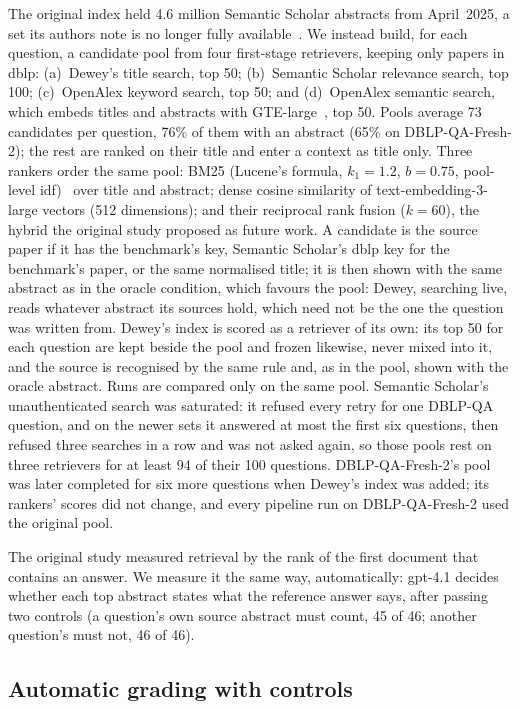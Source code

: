 \documentclass[conference]{IEEEtran}
\newcommand{\dq}{DBLP-QA}
\newcommand{\freshb}{DBLP-QA-Fresh-2}
\begin{document}
The original index held 4.6 million Semantic Scholar abstracts from April~2025, a set its authors note is
no longer fully available~\cite{neekhra2026ragscholar}. We instead build, for each question, a candidate
pool from four first-stage retrievers, keeping only papers in dblp: (a)~Dewey's title search, top 50;
(b)~Semantic Scholar relevance search, top 100; (c)~OpenAlex keyword search, top 50; and (d)~OpenAlex
semantic search, which embeds titles and abstracts with GTE-large~\cite{li2023gte}, top 50. Pools average
73 candidates per question, 76\% of them with an abstract (65\% on \freshb{}); the rest are ranked on their title and enter a
context as title only. Three rankers order the same pool: BM25 (Lucene's formula, $k_1=1.2$, $b=0.75$,
pool-level idf)~\cite{robertson2009bm25} over title and abstract; dense cosine similarity of
text-embedding-3-large vectors (512 dimensions); and their reciprocal rank fusion ($k=60$), the hybrid
the original study proposed as future work. A candidate is the source paper if it has the benchmark's
key, Semantic Scholar's dblp key for the benchmark's paper, or the same normalised title; it is then shown
with the same abstract as in the oracle condition, which favours the pool: Dewey, searching live, reads
whatever abstract its sources hold, which need not be the one the question was written from. Dewey's
index is scored as a retriever of its own: its top 50 for each question are kept beside the pool and
frozen likewise, never mixed into it, and the source is recognised by the same rule and, as in the
pool, shown with the oracle abstract. Runs are compared only on the same pool. Semantic Scholar's
unauthenticated search was saturated: it refused every retry for one \dq{} question, and on the newer
sets it answered at most the first six questions, then refused three searches in a row and was not asked
again, so those pools rest on three retrievers for at least 94 of their 100 questions. \freshb{}'s pool
was later completed for six more questions when Dewey's index was added; its rankers' scores did not
change, and every pipeline run on \freshb{} used the original pool.

The original study measured retrieval by the rank of the first document that contains an answer. We
measure it the same way, automatically: gpt-4.1 decides whether each top abstract states what the
reference answer says, after passing two controls (a question's own source abstract must count, 45 of
46; another question's must not, 46 of 46).

\subsection{Automatic grading with controls}
\label{sec:judge}
\end{document}
